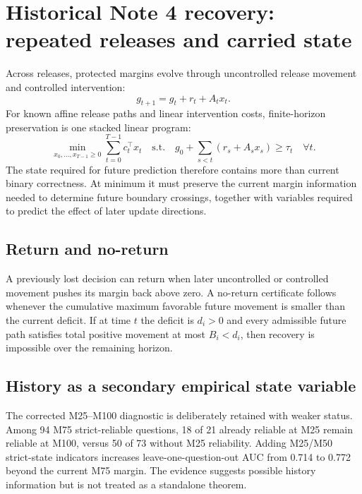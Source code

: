 \documentclass[11pt,letterpaper]{article}
\theoremstyle{plain}
\newcommand{\1}{\mathbf 1}
\begin{document}
\section{Historical Note 4 recovery: repeated releases and carried state}
Across releases, protected margins evolve through uncontrolled release movement and controlled intervention:
\begin{equation}
 g_{t+1}=g_t+r_t+A_tx_t.
\end{equation}
For known affine release paths and linear intervention costs, finite-horizon preservation is one stacked linear program:
\begin{equation}
 \min_{x_0,\ldots,x_{T-1}\ge0}\sum_{t=0}^{T-1}c_t^\top x_t
 \quad\text{s.t.}\quad
 g_0+\sum_{s<t}(r_s+A_sx_s)\ge\tau_t\quad\forall t.
\end{equation}
The state required for future prediction therefore contains more than current binary correctness. At minimum it must preserve the current margin information needed to determine future boundary crossings, together with variables required to predict the effect of later update directions.

\subsection{Return and no-return}
A previously lost decision can return when later uncontrolled or controlled movement pushes its margin back above zero. A no-return certificate follows whenever the cumulative maximum favorable future movement is smaller than the current deficit. If at time $t$ the deficit is $d_i>0$ and every admissible future path satisfies total positive movement at most $B_i<d_i$, then recovery is impossible over the remaining horizon.

\subsection{History as a secondary empirical state variable}
The corrected M25--M100 diagnostic is deliberately retained with weaker status. Among 94 M75 strict-reliable questions, 18 of 21 already reliable at M25 remain reliable at M100, versus 50 of 73 without M25 reliability. Adding M25/M50 strict-state indicators increases leave-one-question-out AUC from 0.714 to 0.772 beyond the current M75 margin. The evidence suggests possible history information but is not treated as a standalone theorem.

\clearpage
\end{document}
